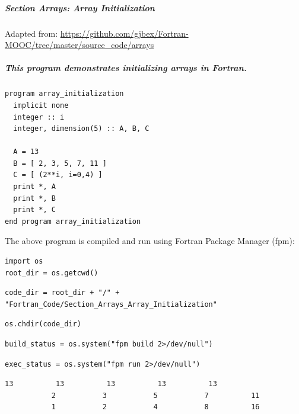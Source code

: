 \subparagraph{Section Arrays: Array Initialization}

Adapted from: \href{https://github.com/gjbex/Fortran-MOOC/tree/master/source\_code/arrays}{https://github.com/gjbex/Fortran-MOOC/tree/master/source\_code/arrays}

\subparagraph{This program demonstrates initializing arrays in Fortran.}

\begin{verbatim}
program array_initialization
  implicit none
  integer :: i
  integer, dimension(5) :: A, B, C

  A = 13
  B = [ 2, 3, 5, 7, 11 ] 
  C = [ (2**i, i=0,4) ] 
  print *, A
  print *, B
  print *, C
end program array_initialization
\end{verbatim}

The above program is compiled and run using Fortran Package Manager (fpm):

\begin{verbatim}
import os
root_dir = os.getcwd()
\end{verbatim}

\begin{verbatim}
code_dir = root_dir + "/" + "Fortran_Code/Section_Arrays_Array_Initialization"
\end{verbatim}

\begin{verbatim}
os.chdir(code_dir)
\end{verbatim}

\begin{verbatim}
build_status = os.system("fpm build 2>/dev/null")
\end{verbatim}

\begin{verbatim}
exec_status = os.system("fpm run 2>/dev/null")
\end{verbatim}

\begin{verbatim}
13          13          13          13          13
           2           3           5           7          11
           1           2           4           8          16
\end{verbatim}